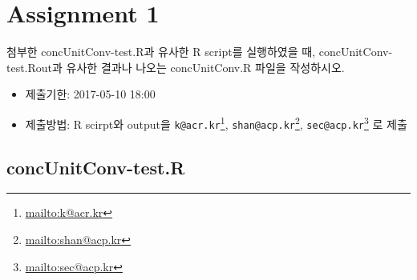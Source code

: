 \documentclass[10pt,]{krantz}
\providecommand{\tightlist}{%
  \setlength{\itemsep}{0pt}\setlength{\parskip}{0pt}}
\renewcommand{\href}[2]{#2\footnote{\url{#1}}}
\begin{document}
\appendix {}


\section{Assignment 1}\label{assignment-1}

첨부한 concUnitConv-test.R과 유사한 R script를 실행하였을 때,
concUnitConv-test.Rout과 유사한 결과나 나오는 concUnitConv.R 파일을
작성하시오.

\begin{itemize}
\tightlist
\item
  제출기한: 2017-05-10 18:00
\item
  제출방법: R scirpt와 output을
  \href{mailto:k@acr.kr}{\nolinkurl{k@acr.kr}},
  \href{mailto:shan@acp.kr}{\nolinkurl{shan@acp.kr}},
  \href{mailto:sec@acp.kr}{\nolinkurl{sec@acp.kr}} 로 제출
\end{itemize}

\subsection{concUnitConv-test.R}\label{concunitconv-test.r}
\end{document}
